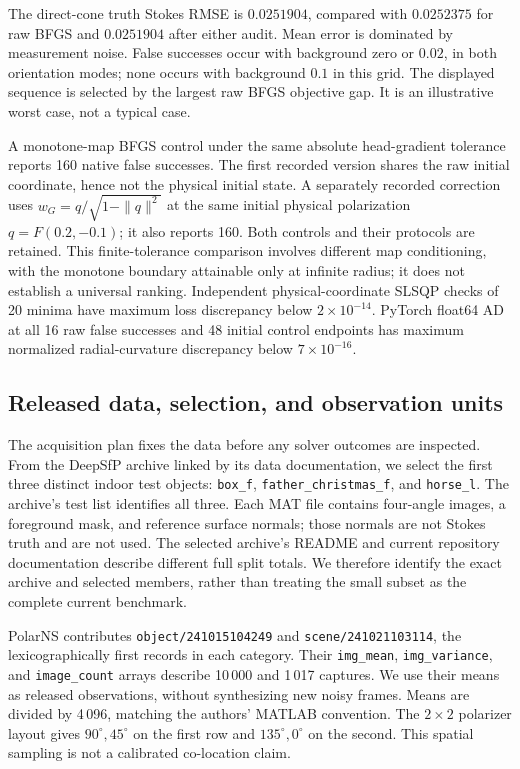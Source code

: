 \documentclass[10pt,a4paper]{article}
\begin{document}
The direct-cone truth Stokes RMSE is $0.0251904$, compared with $0.0252375$ for raw BFGS and $0.0251904$ after either audit. Mean error is dominated by measurement noise. False successes occur with background zero or $0.02$, in both orientation modes; none occurs with background $0.1$ in this grid. The displayed sequence is selected by the largest raw BFGS objective gap. It is an illustrative worst case, not a typical case.

A monotone-map BFGS control under the same absolute head-gradient tolerance reports 160 native false successes. The first recorded version shares the raw initial coordinate, hence not the physical initial state. A separately recorded correction uses $w_G=q/\sqrt{1-\|q\|^2}$ at the same initial physical polarization $q=F(0.2,-0.1)$; it also reports 160. Both controls and their protocols are retained. This finite-tolerance comparison involves different map conditioning, with the monotone boundary attainable only at infinite radius; it does not establish a universal ranking. Independent physical-coordinate SLSQP checks of 20 minima have maximum loss discrepancy below $2\times10^{-14}$. PyTorch float64 AD at all 16 raw false successes and 48 initial control endpoints has maximum normalized radial-curvature discrepancy below $7\times10^{-16}$.

\subsection{Released data, selection, and observation units}
The acquisition plan fixes the data before any solver outcomes are inspected. From the DeepSfP archive linked by its data documentation, we select the first three distinct indoor test objects: \nolinkurl{box_f}, \nolinkurl{father_christmas_f}, and \nolinkurl{horse_l}. The archive's test list identifies all three. Each MAT file contains four-angle images, a foreground mask, and reference surface normals; those normals are not Stokes truth and are not used. The selected archive's README and current repository documentation describe different full split totals. We therefore identify the exact archive and selected members, rather than treating the small subset as the complete current benchmark.

PolarNS contributes \nolinkurl{object/241015104249} and \nolinkurl{scene/241021103114}, the lexicographically first records in each category. Their \nolinkurl{img_mean}, \nolinkurl{img_variance}, and \nolinkurl{image_count} arrays describe 10\,000 and 1\,017 captures. We use their means as released observations, without synthesizing new noisy frames. Means are divided by 4\,096, matching the authors' MATLAB convention. The $2\times2$ polarizer layout gives $90^{\circ},45^{\circ}$ on the first row and $135^{\circ},0^{\circ}$ on the second. This spatial sampling is not a calibrated co-location claim.
\end{document}

